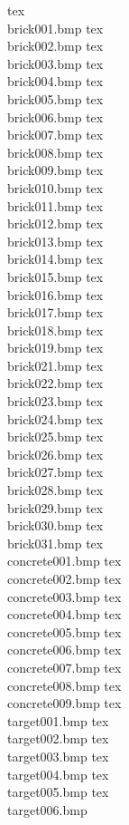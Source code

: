 tex\\brick001.bmp
tex\\brick002.bmp
tex\\brick003.bmp
tex\\brick004.bmp
tex\\brick005.bmp
tex\\brick006.bmp
tex\\brick007.bmp
tex\\brick008.bmp
tex\\brick009.bmp
tex\\brick010.bmp
tex\\brick011.bmp
tex\\brick012.bmp
tex\\brick013.bmp
tex\\brick014.bmp
tex\\brick015.bmp
tex\\brick016.bmp
tex\\brick017.bmp
tex\\brick018.bmp
tex\\brick019.bmp
tex\\brick021.bmp
tex\\brick022.bmp
tex\\brick023.bmp
tex\\brick024.bmp
tex\\brick025.bmp
tex\\brick026.bmp
tex\\brick027.bmp
tex\\brick028.bmp
tex\\brick029.bmp
tex\\brick030.bmp
tex\\brick031.bmp
tex\\concrete001.bmp
tex\\concrete002.bmp
tex\\concrete003.bmp
tex\\concrete004.bmp
tex\\concrete005.bmp
tex\\concrete006.bmp
tex\\concrete007.bmp
tex\\concrete008.bmp
tex\\concrete009.bmp
tex\\target001.bmp
tex\\target002.bmp
tex\\target003.bmp
tex\\target004.bmp
tex\\target005.bmp
tex\\target006.bmp
